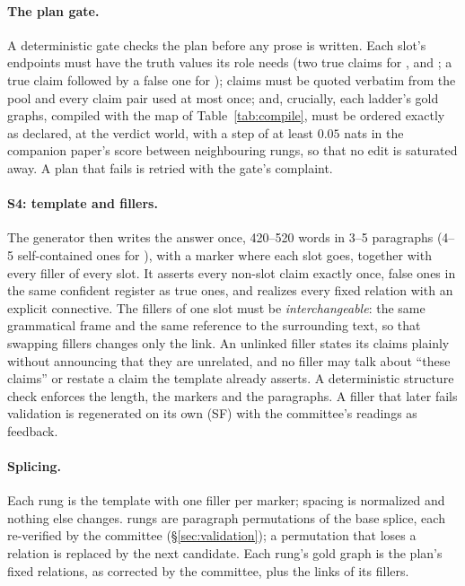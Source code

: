 \documentclass[11pt]{article}
\begin{document}
\paragraph{The plan gate.} A deterministic gate checks the plan before any prose is written. Each
slot's endpoints must have the truth values its role needs (two true claims for ,
 and ; a true claim followed by a false one for ); claims must be
quoted verbatim from the pool and every claim pair used at most once; and, crucially, each
ladder's gold graphs, compiled with the map of Table~\ref{tab:compile}, must be ordered exactly as
declared, at the verdict world, with a step of at least $0.05$ nats in the companion paper's score
between neighbouring rungs, so that no edit is saturated away. A plan that fails is retried with
the gate's complaint.

\paragraph{S4: template and fillers.} The generator then writes the answer once, 420--520 words
in 3--5 paragraphs (4--5 self-contained ones for ), with a marker where each slot goes,
together with every filler of every slot. It asserts every non-slot claim exactly once, false ones
in the same confident register as true ones, and realizes every fixed relation with an explicit
connective. The fillers of one slot must be \emph{interchangeable}: the same grammatical frame and
the same reference to the surrounding text, so that swapping fillers changes only the link. An
unlinked filler states its claims plainly without announcing that they are unrelated, and no
filler may talk about ``these claims'' or restate a claim the template already asserts. A deterministic structure check
enforces the length, the markers and the paragraphs. A filler that later fails validation is
regenerated on its own (SF) with the committee's readings as feedback.

\paragraph{Splicing.} Each rung is the template with one filler per marker; spacing is normalized
and nothing else changes.  rungs are paragraph permutations of the base splice, each
re-verified by the committee (\S\ref{sec:validation}); a permutation that loses a relation is
replaced by the next candidate. Each rung's gold graph is the plan's fixed relations, as corrected
by the committee, plus the links of its fillers.
\end{document}
